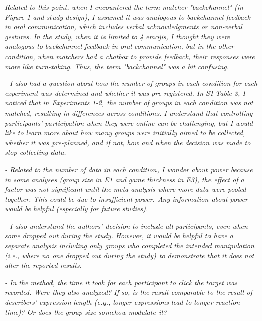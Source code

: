 \documentclass{stanfordletter}
\newcommand{\theysaid}[1]{\begin{leftbar} \noindent 
		\textsl{ #1}\end{leftbar}}
\begin{document}
\begin{letter}{}
          \theysaid{Related to this point, when I encountered the term matcher "backchannel" (in Figure 1 and study design), I assumed it was analogous to backchannel feedback in oral communication, which includes verbal acknowledgments or non-verbal gestures. In the study, when it is limited to 4 emojis, I thought they were analogous to backchannel feedback in oral communication, but in the other condition, when matchers had a chatbox to provide feedback, their responses were more like turn-taking. Thus, the term "backchannel" was a bit confusing.}
          
          \theysaid{- I also had a question about how the number of groups in each condition for each experiment was determined and whether it was pre-registered. In SI Table 3, I noticed that in Experiments 1-2, the number of groups in each condition was not matched, resulting in differences across conditions. I understand that controlling participants' participation when they were online can be challenging, but I would like to learn more about how many groups were initially aimed to be collected, whether it was pre-planned, and if not, how and when the decision was made to stop collecting data.}
          
          \theysaid{- Related to the number of data in each condition, I wonder about power because in some analyses (group size in E1 and game thickness in E3), the effect of a factor was not significant until the meta-analysis where more data were pooled together. This could be due to insufficient power. Any information about power would be helpful (especially for future studies).}
         
          
          \theysaid{- I also understand the authors' decision to include all participants, even when some dropped out during the study. However, it would be helpful to have a separate analysis including only groups who completed the intended manipulation (i.e., where no one dropped out during the study) to demonstrate that it does not alter the reported results.}
          
          \theysaid{- In the method, the time it took for each participant to click the target was recorded. Were they also analyzed? If so, is the result comparable to the result of describers' expression length (e.g., longer expressions lead to longer reaction time)? Or does the group size somehow modulate it?}
          

\end{letter}
\end{document}
